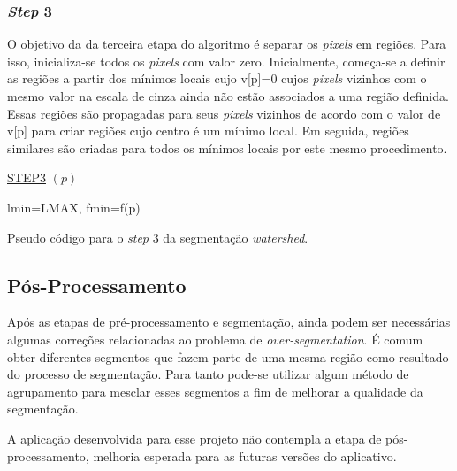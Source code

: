 \subsubsection{\textit{Step} 3}
O objetivo da da terceira etapa do algoritmo é separar os \textit{pixels} em regiões. Para isso, inicializa-se todos os \textit{pixels} com valor zero. Inicialmente, começa-se a definir as regiões a partir dos mínimos locais cujo v[p]=0 cujos \textit{pixels} vizinhos com o mesmo valor na escala de cinza ainda não estão associados a uma região definida. Essas regiões são propagadas para seus \textit{pixels} vizinhos de acordo com o valor de v[p] para criar regiões cujo centro é um mínimo local. Em seguida, regiões similares são criadas para todos os mínimos locais por este mesmo procedimento.

\begin{algorithm}[H]
\SetAlgoLined


    \underline{STEP3} $(p)$\;
		
		lmin=LMAX, fmin=f(p)\\
    
    
 
 
\caption{Pseudo código para o \textit{step} 3 da segmentação \textit{watershed}.\cite{ruparelia2012implementation}}
\end{algorithm}




\subsection{Pós-Processamento}
Após as etapas de pré-processamento e segmentação, ainda podem ser necessárias algumas correções relacionadas ao problema de \textit{over-segmentation}. É comum obter diferentes segmentos que fazem parte de uma mesma região como resultado do processo de segmentação. Para tanto pode-se utilizar algum método de agrupamento para mesclar esses segmentos a fim de melhorar a qualidade da segmentação. 

A aplicação desenvolvida para esse projeto não contempla a etapa de pós-processamento, melhoria esperada para as futuras versões do aplicativo.


